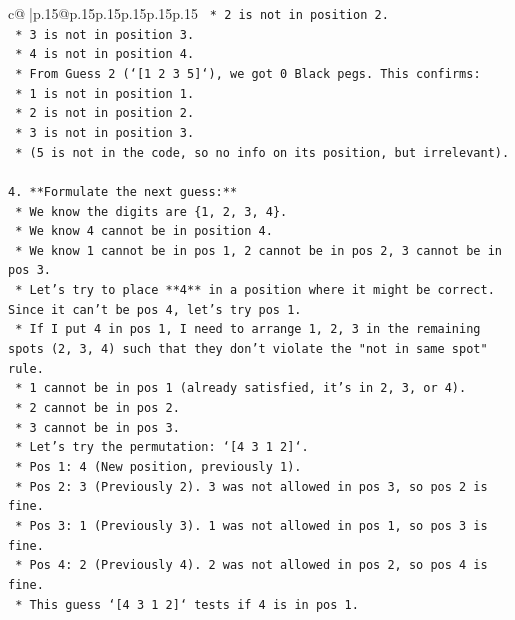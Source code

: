 \documentclass{article}
\begin{document}
{\begin{supertabular}{c@{$\;$}|p{.15\linewidth}@{}p{.15\linewidth}p{.15\linewidth}p{.15\linewidth}p{.15\linewidth}p{.15\linewidth}}
{{{\texttt{        *   2 is not in position 2.} \\
\texttt{        *   3 is not in position 3.} \\
\texttt{        *   4 is not in position 4.} \\
\texttt{    *   From Guess 2 (`{[}1 2 3 5{]}`), we got 0 Black pegs. This confirms:} \\
\texttt{        *   1 is not in position 1.} \\
\texttt{        *   2 is not in position 2.} \\
\texttt{        *   3 is not in position 3.} \\
\texttt{        *   (5 is not in the code, so no info on its position, but irrelevant).} \\
\\ 
\texttt{4.  **Formulate the next guess:**} \\
\texttt{    *   We know the digits are \{1, 2, 3, 4\}.} \\
\texttt{    *   We know 4 cannot be in position 4.} \\
\texttt{    *   We know 1 cannot be in pos 1, 2 cannot be in pos 2, 3 cannot be in pos 3.} \\
\texttt{    *   Let's try to place **4** in a position where it might be correct. Since it can't be pos 4, let's try pos 1.} \\
\texttt{    *   If I put 4 in pos 1, I need to arrange 1, 2, 3 in the remaining spots (2, 3, 4) such that they don't violate the "not in same spot" rule.} \\
\texttt{        *   1 cannot be in pos 1 (already satisfied, it's in 2, 3, or 4).} \\
\texttt{        *   2 cannot be in pos 2.} \\
\texttt{        *   3 cannot be in pos 3.} \\
\texttt{    *   Let's try the permutation: `{[}4 3 1 2{]}`.} \\
\texttt{        *   Pos 1: 4 (New position, previously 1).} \\
\texttt{        *   Pos 2: 3 (Previously 2). 3 was not allowed in pos 3, so pos 2 is fine.} \\
\texttt{        *   Pos 3: 1 (Previously 3). 1 was not allowed in pos 1, so pos 3 is fine.} \\
\texttt{        *   Pos 4: 2 (Previously 4). 2 was not allowed in pos 2, so pos 4 is fine.} \\
\texttt{    *   This guess `{[}4 3 1 2{]}` tests if 4 is in pos 1.} \\
}}}
\end{supertabular}}
\end{document}
